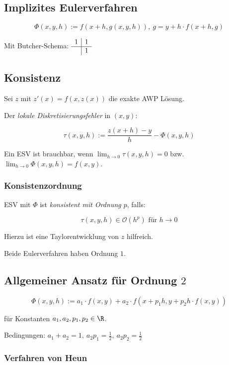 \subsection*{Implizites Eulerverfahren}

\[ \Phi(x,y,h) := f(x+h, g(x,y,h)), \ g = y + h \cdot f(x+h, g) \]

Mit Butcher-Schema: $\begin{array}{c|c}
1 & 1 \\
\hline
  & 1
\end{array}$


\subsection*{Konsistenz}

Sei $z$ mit $z'(x) = f(x,z(x))$ die exakte AWP Lösung.

Der \emph{lokale Diskretisierungsfehler} in $(x,y)$:

\[ \tau(x,y,h) := \frac{z(x+h)-y}{h} - \Phi(x,y,h) \]

Ein ESV ist brauchbar, wenn $\lim_{h \to 0} \tau(x,y,h) = 0$ bzw. $\lim_{h \to 0} \Phi(x,y,h) = f(x,y)$.

\subsubsection*{Konsistenzordnung}

ESV mit $\Phi$ ist \emph{konsistent mit Ordnung $p$}, falls:

\vspace*{-2mm}
\[ \tau(x,y,h) \in \mathcal{O}(h^p) \text{ für } h \to 0 \]

Hierzu ist eine Taylorentwicklung von $z$ hilfreich.

Beide Eulerverfahren haben Ordnung $1$.

\subsection*{Allgemeiner Ansatz für Ordnung $2$}

\[ \Phi(x,y,h) := a_1 \cdot f(x,y) + a_2 \cdot f(x+p_1 h, y+p_2 h \cdot f(x,y)) \]

für Konstanten $a_1, a_2, p_1, p_2 \in \R$.

\spacing

Bedingungen: $a_1 + a_2 = 1, \ a_2 p_1 = \frac{1}{2}, \ a_2 p_2 = \frac{1}{2}$

\subsubsection*{Verfahren von Heun}

